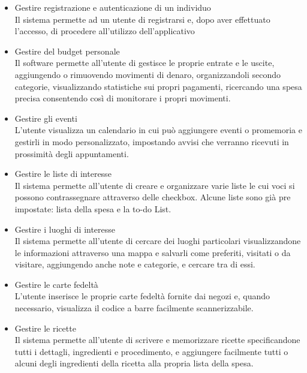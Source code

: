 \documentclass[a4paper,12pt]{article}
\begin{document}
\begin{itemize}
 \setlength\itemsep{0.01em}

\item {\sffamily  Gestire registrazione e autenticazione di un individuo } 
\\Il sistema permette ad un utente di registrarsi e, dopo aver effettuato l'accesso, di procedere all'utilizzo dell'applicativo
\item {\sffamily Gestire del budget personale } 
\\Il software permette all'utente di gestisce le proprie entrate e le uscite, aggiungendo o rimuovendo movimenti di denaro, organizzandoli secondo categorie, visualizzando statistiche sui propri pagamenti, ricercando una spesa precisa consentendo così di monitorare i propri movimenti.
\item {\sffamily Gestire gli eventi } 
\\L'utente visualizza un calendario in cui può aggiungere eventi o promemoria e gestirli in modo personalizzato, impostando avvisi che verranno ricevuti in prossimità degli appuntamenti.
\item {\sffamily  Gestire le liste di interesse} 
\\ Il sistema permette all'utente di creare e organizzare varie liste le cui voci si possono contrassegnare attraverso delle checkbox. Alcune liste sono già pre impostate: lista della spesa e la to-do List.
\item {\sffamily Gestire i luoghi di interesse } 
\\Il sistema permette all'utente di cercare dei luoghi particolari visualizzandone le informazioni attraverso una mappa e salvarli come preferiti, visitati o da visitare, aggiungendo anche note e categorie, e cercare tra di essi.
\item {\sffamily Gestire le carte fedeltà } 
\\L'utente inserisce le proprie carte fedeltà fornite dai negozi e, quando necessario, visualizza il codice a barre facilmente scannerizzabile.
\item {\sffamily Gestire le ricette} 
\\ Il sistema permette all'utente di scrivere e memorizzare ricette specificandone tutti i dettagli, ingredienti e procedimento, e aggiungere facilmente tutti o alcuni degli ingredienti della ricetta alla propria lista della spesa.

\end{itemize}
\end{document}
